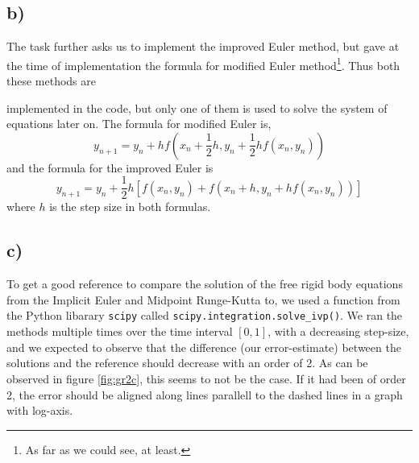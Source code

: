 \documentclass[12pt, a4paper,usenames,dvipsnames]{article}
\begin{document}
\subsection*{b)}
The task further asks us to implement the improved Euler method, but gave at the time of implementation the formula for modified Euler method\footnote{As far as we could see, at least.}. Thus both these methods are 
\pagestyle{fancyplain}
\fancyhf{}
\label{fig:gr2c}
implemented in the code, but only one of them is used to solve the system of equations later on.
The formula for modified Euler is,
\[y_{n+1} = y_n + hf\left(x_n + \frac{1}{2}h, y_n + \frac{1}{2}hf(x_n, y_n)\right)\]
and the formula for the improved Euler is
\[y_{n+1} = y_n + \frac{1}{2}h[f(x_n,y_n) + f(x_n + h, y_n + hf(x_n, y_n))]\]
where $h$ is the step size in both formulas. 

\subsection*{c)}
\lstset{language=Python}
To get a good reference to compare the solution of the free rigid body equations from the Implicit Euler and Midpoint Runge-Kutta to, we used a function from the Python libarary \lstinline{scipy} called \lstinline{scipy.integration.solve_ivp()}. We ran the methods multiple times over the time interval \([0,1]\), with a decreasing step-size, and we expected to observe that the difference (our error-estimate) between the solutions and the reference should decrease with an order of 2. As can be observed in figure \ref{fig:gr2c}, this seems to not be the case. If it had been of order 2, the error should be aligned along lines parallell to the dashed lines in a graph with log-axis. 
\end{document}
